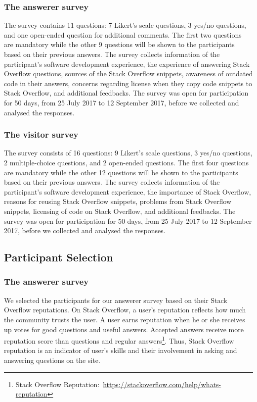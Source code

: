 \documentclass{svjour3}                     %
\begin{document}
\subsubsection{The answerer survey} 
The survey contains 11 questions: 7 Likert's
scale questions, 3 yes/no questions, and one open-ended question for additional
comments. The first two questions are mandatory while the other 9 questions will
be shown to the participants based on their previous answers. The survey
collects information of the participant's software development experience, the
experience of answering Stack Overflow questions, sources of the Stack Overflow
snippets, awareness of outdated code in their answers, concerns regarding
license when they copy code snippets to Stack Overflow, and additional
feedbacks. The survey was open for participation for 50 days, from 25 July 2017
to 12 September 2017, before we collected and analysed the responses.

\subsubsection{The visitor survey} 
The survey consists of 16 questions: 9 Likert's
scale questions, 3 yes/no questions, 2 multiple-choice questions, and 2
open-ended questions. The first four questions are mandatory while the other 12
questions will be shown to the participants based on their previous answers. The
survey collects information of the participant's software development
experience, the importance of Stack Overflow, reasons for reusing Stack Overflow
snippets, problems from Stack Overflow snippets, licensing of code on Stack
Overflow, and additional feedbacks. The survey was open for participation for 50
days, from 25 July 2017 to 12 September 2017, before we collected and analysed
the responses.

\subsection{Participant Selection}

\subsubsection{The answerer survey} 
We selected the participants for our answerer survey based on their Stack
Overflow reputations. On Stack Overflow, a user's reputation reflects how much
the community trusts the user. A user earns reputation when he or she receives
up votes for good questions and useful answers. Accepted answers receive more
reputation score than questions and regular answers\footnote{Stack Overflow
	Reputation:~\url{https://stackoverflow.com/help/whats-reputation}}. Thus, Stack
Overflow reputation is an indicator of user's skills and their involvement in
asking and answering questions on the site.
\end{document}
